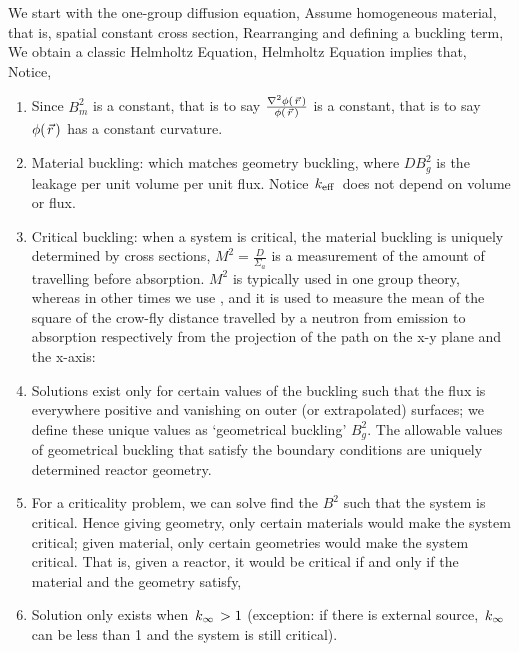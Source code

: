 \documentclass{school-22.211-notes}
\begin{document}
We start with the one-group diffusion equation,
Assume homogeneous material, that is, spatial constant cross section,
Rearranging and defining a buckling term, 
We obtain a classic Helmholtz Equation,
Helmholtz Equation implies that,
Notice,
\begin{enumerate}
\item Since $B_m^2$ is a constant, that is to say $\frac{\nabla^2 \phi(\left.\vec{r}\right.)}{\phi(\left.\vec{r}\right.)}$ is a constant, that is to say $\phi(\left.\vec{r}\right.)$ has a constant curvature. 
\item Material buckling: 
  which matches geometry buckling, 
  where $DB^2_g$ is the leakage per unit volume per unit flux. Notice $\left. k_{\mathrm{eff}} \right.$ does not depend on volume or flux. 

\item Critical buckling: when a system is critical, the material buckling is uniquely determined by cross sections, 
   $M^2 = \frac{D}{\Sigma_a}$ is a measurement of the amount of travelling before absorption. $M^2$ is typically used in one group theory, whereas in other times we use , and it is used to measure the mean of the square of the crow-fly distance travelled by a neutron from emission to absorption respectively from the projection of the path on the x-y plane and the x-axis: 

\item Solutions exist only for certain values of the buckling such that the flux is everywhere positive and vanishing on outer (or extrapolated) surfaces; we define these unique values as `geometrical buckling' $B_g^2$. The allowable values of geometrical buckling that satisfy the boundary conditions are uniquely determined reactor geometry.

\item For a criticality problem, we can solve find the $B^2$ such that the system is critical. Hence giving geometry, only certain materials would make the system critical; given material, only certain geometries would make the system critical. That is, given a reactor, it would be critical if and only if the material and the geometry satisfy,

\item Solution only exists when $\left. k_{\infty} \right. > 1$ (exception: if there is external source, $\left. k_{\infty} \right.$ can be less than 1 and the system is still critical). 
\end{enumerate}
\end{document}
